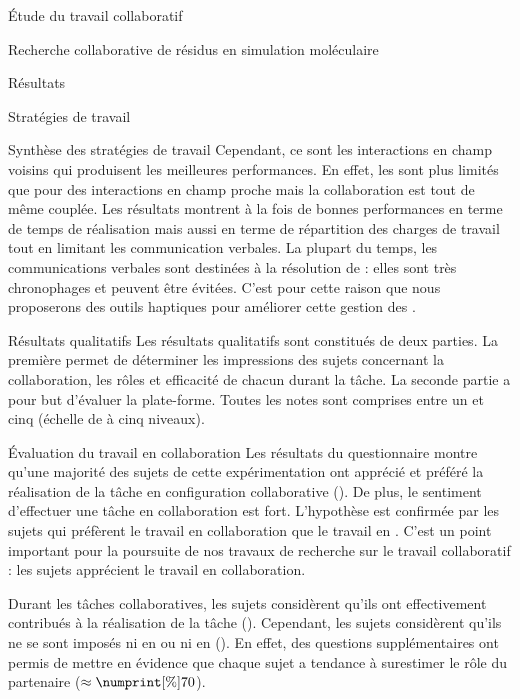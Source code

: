 \documentclass[myfrancais]{mythesis}
\begin{document}
\begin{mypart}{Étude du travail collaboratif}
\begin{mychapter}{Recherche collaborative de résidus en simulation moléculaire}
\begin{mysection}{Résultats}
\begin{mysubsection}{Stratégies de travail}
\begin{mysubsubsection}{Synthèse des stratégies de travail}
						Cependant, ce sont les interactions en champ voisins qui produisent les meilleures performances.
						En effet, les  sont plus limités que pour des interactions en champ proche mais la collaboration est tout de même couplée.
						Les résultats montrent à la fois de bonnes performances en terme de temps de réalisation mais aussi en terme de répartition des charges de travail tout en limitant les communication verbales.
						La plupart du temps, les communications verbales sont destinées à la résolution de  : elles sont très chronophages et peuvent être évitées.
						C'est pour cette raison que nous proposerons des outils haptiques pour améliorer cette gestion des  .
					\end{mysubsubsection}
				\end{mysubsection}
				\begin{mysubsection}{Résultats qualitatifs}
					Les résultats qualitatifs sont constitués de deux parties.
					La première permet de déterminer les impressions des sujets concernant la collaboration, les rôles et efficacité de chacun durant la tâche.
					La seconde partie a pour but d'évaluer la plate-forme.
					Toutes les notes sont comprises entre un et cinq (échelle de  à cinq niveaux).
					\begin{mysubsubsection}{Évaluation du travail en collaboration}
						Les résultats du questionnaire montre qu'une majorité des sujets de cette expérimentation ont apprécié et préféré la réalisation de la tâche en configuration collaborative ().
						De plus, le sentiment d'effectuer une tâche en collaboration est fort.
						L'hypothèse  est confirmée par les sujets qui préfèrent le travail en collaboration que le travail en .
						C'est un point important pour la poursuite de nos travaux de recherche sur le travail collaboratif : les sujets apprécient le travail en collaboration.

						Durant les tâches collaboratives, les sujets considèrent qu'ils ont effectivement contribués à la réalisation de la tâche ().
						Cependant, les sujets considèrent qu'ils ne se sont imposés ni en  ou ni en  ().
						En effet, des questions supplémentaires ont permis de mettre en évidence que chaque sujet a tendance à surestimer le rôle du partenaire ($\approx\mynum[\%]{70}$).


\end{mysubsubsection}
\end{mysubsection}
\end{mysection}
\end{mychapter}
\end{mypart}
\end{document}
